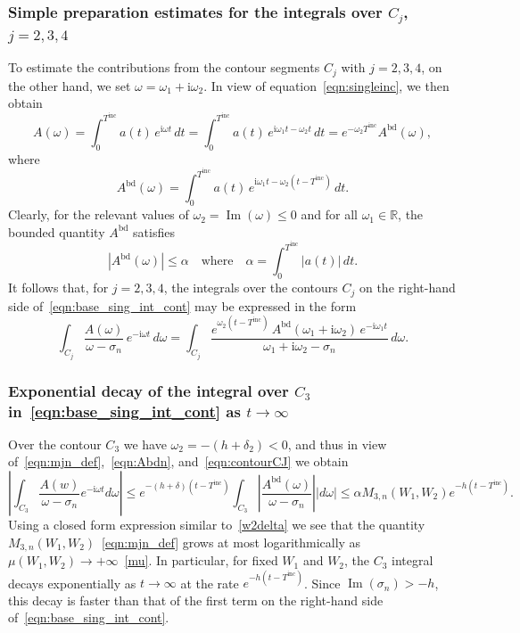 \documentclass[11pt]{article}
\theoremstyle{plain}
\theoremstyle{remark}
\renewcommand{\Im}{\operatorname{Im}}
\begin{document}
\subsubsection{Simple preparation estimates for the integrals over $C_j$, $j = 2,3,4$}
To estimate the contributions from the contour segments $C_j$ with
$j = 2,3,4$, on the other hand, we set $\omega = \omega_1 +
\mathrm{i}\omega_2$. In view of
equation~\eqref{eqn:singleinc}, we then obtain
\begin{equation*}
    A(\omega) = \int_0^{T^\mathrm{inc}} a(t)\, e^{\mathrm{i}\omega t} \, dt =\int_0^{T^\mathrm{inc}} a(t)\, e^{\mathrm{i}\omega_1 t - \omega_2 t} \, dt = e^{-\omega_2 T^\mathrm{inc}} A^{\mathrm{bd}}(\omega),
\end{equation*}
where
\begin{equation*}
    A^{\mathrm{bd}}(\omega) = \int_0^{T^\mathrm{inc}} a(t)\, e^{\mathrm{i}\omega_1 t - \omega_2(t - T^\mathrm{inc})} \, dt.
\end{equation*}
Clearly, for the relevant values of $\omega_2 = \Im(\omega) \leq 0$
and for all $\omega_1\in\mathbb{R}$, the bounded quantity
$A^{\mathrm{bd}}$ satisfies
\begin{equation}\label{eqn:Abdn}
   |A^{\mathrm{bd}}(\omega)| \leq \alpha\quad\mbox{where}\quad \alpha = \int_0^{T^\mathrm{inc}} |a(t)| \, dt. 
\end{equation}
It follows that, for $j = 2,3,4$, the integrals over the contours
$C_j$ on the right-hand side of~\eqref{eqn:base_sing_int_cont} may be
expressed in the form
\begin{equation}\label{eqn:contourCJ}
  \int_{C_j} \frac{A(\omega)}{\omega - \sigma_n} \, e^{-\mathrm{i} \omega t} \, d\omega = \int_{C_j} \frac{e^{\omega_2 (t - T^\mathrm{inc})} \, A^{\mathrm{bd}}(\omega_1 + \mathrm{i} \omega_2) \, e^{-\mathrm{i} \omega_1 t}}{\omega_1 + \mathrm{i} \omega_2 - \sigma_n} \, d\omega.
\end{equation}
\subsubsection{Exponential decay of the integral over $C_3$
  in~\eqref{eqn:base_sing_int_cont} as $t \to \infty$ \label{exp-dec}}
Over the contour $C_3$ we have $\omega_2 = -(h + \delta_2) < 0$, and thus in view of~\eqref{eqn:mjn_def},~\eqref{eqn:Abdn}, and~\eqref{eqn:contourCJ} we obtain
\begin{equation}\label{eqn:contourC2}
  \left | \int_{C_3}\frac{A(w)}{\omega - \sigma_n}e^{-\mathrm{i}\omega t}d\omega\right |\le e^{-(h + \delta)(t-T^\mathrm{inc})}\int_{C_3} \left|\frac{A^\mathrm{bd}(\omega)}{\omega - \sigma_n}\right||d\omega| \le \alpha M_{3,n}(W_1,W_2) e^{-h(t-T^\mathrm{inc})}.
\end{equation}
Using a closed form expression similar to~\eqref{w2delta} we see that
the quantity $M_{3,n}(W_1,W_2)$~\eqref{eqn:mjn_def} grows at most
logarithmically as $\mu(W_1,W_2)\to+\infty$~\eqref{mu}. In particular,
for fixed $W_1$ and $W_2$, the $C_3$ integral decays exponentially as
$t \to \infty$ at the rate $e^{-h(t - T^\mathrm{inc})}$. Since
$\Im(\sigma_n) > -h$, this decay is faster than that of the first term
on the right-hand side of~\eqref{eqn:base_sing_int_cont}.
\end{document}
